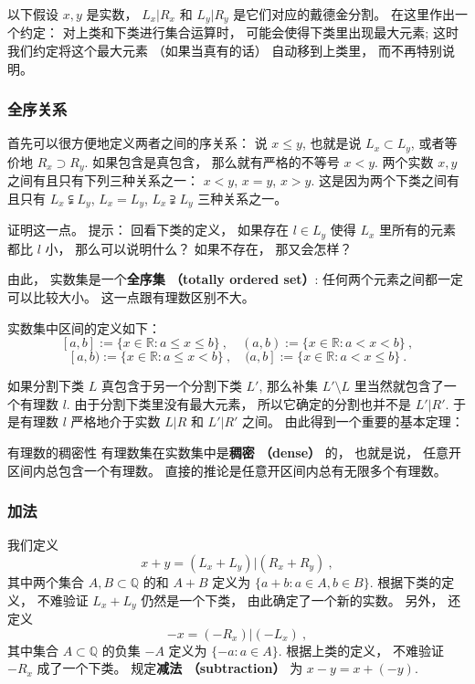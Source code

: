 以下假设 $x,y$ 是实数， $L_x| R_x$ 和 $L_y| R_y$ 是它们对应的戴德金分割。 在这里作出一个约定： 对上类和下类进行集合运算时， 可能会使得下类里出现最大元素; 这时我们约定将这个最大元素 （如果当真有的话） 自动移到上类里， 而不再特别说明。

\subsubsection{全序关系}

首先可以很方便地定义两者之间的序关系： 说 $x\leq y$, 也就是说 $L_x\subset L_y$, 或者等价地 $R_x\supset R_y$. 如果包含是真包含， 那么就有严格的不等号 $x<y$. 两个实数 $x,y$ 之间有且只有下列三种关系之一： $x<y$, $x=y$, $x>y$. 这是因为两个下类之间有且只有 $L_x\subsetneqq L_y$, $L_x=L_y$, $L_x\supsetneqq L_y$ 三种关系之一。

\begin{exercise}{}
证明这一点。 提示： 回看下类的定义， 如果存在 $l\in L_y$ 使得 $L_x$ 里所有的元素都比 $l$ 小， 那么可以说明什么？ 如果不存在， 那又会怎样？
\end{exercise}

由此， 实数集是一个\textbf{全序集 （totally ordered set）}: 任何两个元素之间都一定可以比较大小。 这一点跟有理数区别不大。

实数集中区间的定义如下： 
$$
[a,b]:=\{x\in\mathbb{R}:a\leq x\leq b\}~,
\quad
(a,b):=\{x\in\mathbb{R}:a< x< b\}~,
$$
$$
[a,b):=\{x\in\mathbb{R}:a\leq x< b\}~,
\quad
(a,b]:=\{x\in\mathbb{R}:a< x\leq b\}~.
$$

如果分割下类 $L$ 真包含于另一个分割下类 $L'$, 那么补集 $L'\setminus L$ 里当然就包含了一个有理数 $l$. 由于分割下类里没有最大元素， 所以它确定的分割也并不是 $L'|R'$. 于是有理数 $l$ 严格地介于实数 $L|R$ 和 $L'|R'$ 之间。 由此得到一个重要的基本定理：
\begin{theorem}{有理数的稠密性}
有理数集在实数集中是\textbf{稠密 （dense）} 的， 也就是说， 任意开区间内总包含一个有理数。 直接的推论是任意开区间内总有无限多个有理数。
\end{theorem}

\subsubsection{加法}

我们定义
$$
x+y=(L_x+L_y)|(R_x+R_y)~,
$$
其中两个集合 $A,B\subset\mathbb{Q}$ 的和 $A+B$ 定义为 $\{a+b:a\in A, b\in B\}$. 根据下类的定义， 不难验证 $L_x+L_y$ 仍然是一个下类， 由此确定了一个新的实数。 另外， 还定义
$$
-x=(-R_x)|(-L_x)~,
$$
其中集合 $A\subset\mathbb{Q}$ 的负集 $-A$ 定义为 $\{-a:a\in A\}$. 根据上类的定义， 不难验证 $-R_x$ 成了一个下类。 规定\textbf{减法 （subtraction）} 为 $x-y=x+(-y)$.

